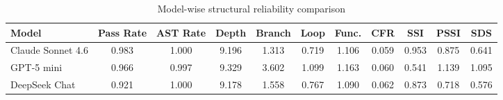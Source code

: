 \begin{table}[t]
\centering
\caption{Model-wise structural reliability comparison}
\label{tab:model_structural_reliability}
\begin{tabular}{lcccccccccc}
\toprule
Model & Pass Rate & AST Rate & Depth & Branch & Loop & Func. & CFR & SSI & PSSI & SDS \\
\midrule
Claude Sonnet 4.6 & 0.983 & 1.000 & 9.196 & 1.313 & 0.719 & 1.106 & 0.059 & 0.953 & 0.875 & 0.641 \\
GPT-5 mini & 0.966 & 0.997 & 9.329 & 3.602 & 1.099 & 1.163 & 0.060 & 0.541 & 1.139 & 1.095 \\
DeepSeek Chat & 0.921 & 1.000 & 9.178 & 1.558 & 0.767 & 1.090 & 0.062 & 0.873 & 0.718 & 0.576 \\
\bottomrule
\end{tabular}
\end{table}
